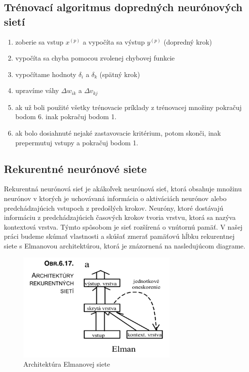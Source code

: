 \subsection{Trénovací algoritmus dopredných neurónových sietí}
\begin{enumerate}
	\item zoberie sa vstup $x^{(p)}$ a vypočíta sa výstup $y^{(p)}$ (dopredný krok)
	\item vypočíta sa chyba pomocou zvolenej chybovej funkcie
	\item vypočítame hodnoty $\delta_{i}$ a $\delta_{k}$  (spätný krok)
	\item upravíme váhy $\Delta w_{ik}$ a $\Delta v_{kj}$
	\item ak už boli použité všetky trénovacie príklady z trénovacej množiny pokračuj bodom 6. inak pokračuj bodom 1.
	\item ak bolo dosiahnuté nejaké zastavovacie kritérium, potom skonči, inak prepermutuj vstupy a pokračuj bodom 1.
\end{enumerate}
                         

\subsection{Rekurentné neurónové siete}
Rekurentná neurónová sieť je akákoľvek neurónová sieť, ktorá obsahuje množinu neurónov
v ktorých je uchovávaná informácia o aktiváciách neurónov alebo predchádzajúcich vstupoch z predošlých krokov. 
Neuróny, ktoré dostávajú informáciu z predchádzajúcich časových krokov tvoria vrstvu, ktorá sa nazýva kontextová vrstva.
Týmto spôsobom je sieť rozšírená o vnútornú pamäť.
V našej práci budeme skúmať vlastnosti a skúšať zmerať pamäťovú hĺbku rekurentnej siete s Elmanovou architektúrou, 
ktorá je znázornená na nasledujúcom diagrame.

\begin{figure}[H]
	\centering
	\includegraphics[width=8cm]{assets/elman_architecture}
	\caption{Architektúra Elmanovej siete \protect\cite{navrat}}

\end{figure}

